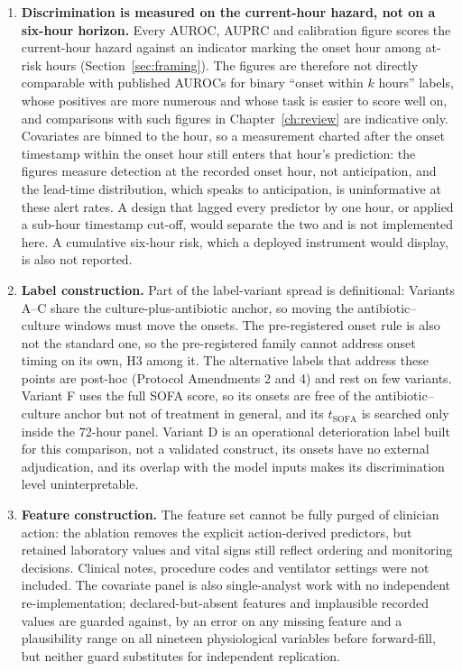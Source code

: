 \begin{enumerate}
    \item \label{lim:current_hour}\textbf{Discrimination is measured on the
    current-hour hazard, not on a six-hour horizon.} Every AUROC, AUPRC and
    calibration figure scores the current-hour hazard against an indicator
    marking the onset hour among at-risk hours (Section~\ref{sec:framing}).
    The figures are therefore not directly comparable with published AUROCs for
    binary ``onset within $k$ hours'' labels, whose positives are more numerous
    and whose task is easier to score well on, and comparisons with such
    figures in Chapter~\ref{ch:review} are indicative only. Covariates are
    binned to the hour, so a measurement charted after the onset timestamp
    within the onset hour still enters that hour's prediction: the figures
    measure detection at the recorded onset hour, not anticipation, and the
    lead-time distribution, which speaks to anticipation, is uninformative at
    these alert rates. A design that lagged every predictor by one hour, or
    applied a sub-hour timestamp cut-off, would separate the two and is not
    implemented here. A cumulative six-hour risk, which a deployed instrument
    would display, is also not reported.

    \item \textbf{Label construction.}\label{lim:label_construction} Part of the label-variant spread is
    definitional: Variants A--C share the culture-plus-antibiotic anchor, so
    moving the antibiotic--culture windows must move the onsets. The
    pre-registered onset rule is also not the standard one, so the
    pre-registered family cannot address onset timing on its own, H3 among
    it. The alternative labels that address these points are post-hoc
    (Protocol Amendments 2 and 4) and rest on few variants. Variant F uses the
    full SOFA score, so its onsets are free of the antibiotic--culture anchor
    but not of treatment in general, and its $t_{\text{SOFA}}$ is searched only
    inside the 72-hour panel. Variant D is an operational deterioration label
    built for this comparison, not a validated construct, its onsets have no
    external adjudication, and its overlap with the model inputs makes its
    discrimination level uninterpretable.

    \item \textbf{Feature construction.}\label{lim:features} The feature set
    cannot be fully purged of clinician action: the ablation removes the
    explicit action-derived predictors, but retained laboratory values and
    vital signs still reflect ordering and monitoring decisions. Clinical
    notes, procedure codes and ventilator settings were not included. The
    covariate panel is also single-analyst work with no independent
    re-implementation; declared-but-absent features and implausible recorded
    values are guarded against, by an error on any missing feature and a
    plausibility range on all nineteen physiological variables before
    forward-fill, but neither guard substitutes for independent replication.


\end{enumerate}
